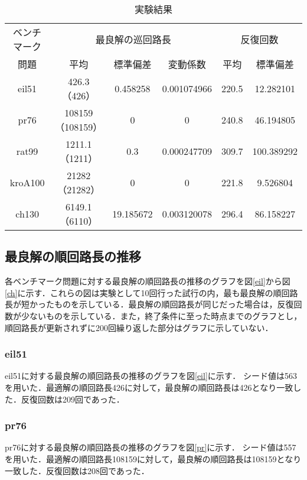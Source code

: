 \documentclass[a4j]{jsarticle}
\begin{document}
\begin{table}[H]
\begin{center}
 \caption{実験結果}
 \label{result}
 \begin{tabular}[tb]{|c||c|c|c||c|c|}\hline
  ベンチマーク& \multicolumn{3}{|c||}{最良解の巡回路長} & \multicolumn{2}{|c|}{反復回数}  \\ \cline{2-6}
  問題& 平均 & 標準偏差 & 変動係数 & 平均 & 標準偏差 \\\hline 
  eil51 & 426.3（426） & 0.458258 & 0.001074966 & 220.5 & 12.282101 \\\hline
  pr76 & 108159（108159） & 0 & 0 & 240.8 & 46.194805 \\\hline
  rat99 & 1211.1（1211） & 0.3 & 0.000247709 & 309.7 & 100.389292 \\\hline
  kroA100 & 21282（21282） & 0 & 0 & 221.8 & 9.526804 \\\hline
  ch130 & 6149.1（6110） & 19.185672 & 0.003120078 & 296.4 & 86.158227 \\\hline
 \end{tabular}
\end{center} 
\end{table}

\subsection{最良解の順回路長の推移}
各ベンチマーク問題に対する最良解の順回路長の推移のグラフを図\ref{eil}から図\ref{ch}に示す．これらの図は実験として10回行った試行の内，最も最良解の順回路長が短かったものを示している．最良解の順回路長が同じだった場合は，反復回数が少ないものを示している．また，終了条件に至った時点までのグラフとし，順回路長が更新されずに200回繰り返した部分はグラフに示していない．

\subsubsection{eil51}
eil51に対する最良解の順回路長の推移のグラフを図\ref{eil}に示す．
シード値は563を用いた．最適解の順回路長426に対して，最良解の順回路長は426となり一致した．反復回数は209回であった．

\subsubsection{pr76}
pr76に対する最良解の順回路長の推移のグラフを図\ref{pr}に示す．
シード値は557を用いた．最適解の順回路長108159に対して，最良解の順回路長は108159となり一致した．反復回数は208回であった．
\end{document}
